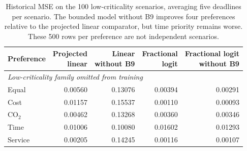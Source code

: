 \begin{table}[htbp]\centering\small
\begin{tabular}{lrrrr}\toprule
Preference & \shortstack{Projected\\linear} & \shortstack{Linear\\without B9} & \shortstack{Fractional\\logit} & \shortstack{Fractional logit\\without B9}\\\midrule
\multicolumn{5}{l}{\textit{Low-criticality family omitted from training}}\\
Equal & 0.00560 & 0.13076 & 0.00394 & 0.00291\\
Cost & 0.01157 & 0.15537 & 0.00110 & 0.00093\\
CO$_2$ & 0.00462 & 0.13268 & 0.00360 & 0.00346\\
Time & 0.01006 & 0.10080 & 0.01602 & 0.01293\\
Service & 0.00205 & 0.14245 & 0.00116 & 0.00107\\
\bottomrule
\end{tabular}
\caption{Historical MSE on the 100 low-criticality scenarios, averaging five deadlines per scenario. The bounded model without B9 improves four preferences relative to the projected linear comparator, but time priority remains worse. These 500 rows per preference are not independent scenarios.}\label{tab:bounded_low_family}
\end{table}
